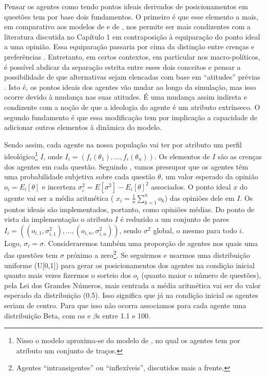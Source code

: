 Pensar os agentes como tendo pontos ideais derivados de posicionamentos em
questões tem por base dois fundamentos. O primeiro é que esse elemento a mais,
em comparativo aos modelos de  e de
, nos permite ser mais condizentes com a
literatura discutida no Capítulo 1 em contraposição à equiparação do ponto ideal
a uma opinião. Essa equiparação passaria por cima da distinção entre crenças e
preferências \cite{list2009judgment}. Entretanto, em certos contextos, em
particular nos macro-políticos, é possível abdicar da separação estrita entre
esses dois conceitos e pensar a possibilidade de que alternativas sejam
elencadas com base em ``atitudes'' prévias
\cite{binmore2008rational,laver2014measuring}. Isto é, os pontos ideais dos
agentes vão mudar ao longo da simulação, mas isso ocorre devido à mudança nas
suas atitudes. É uma mudança assim indireta e condizente com a noção de que a
ideologia do agente é um atributo extrínseco. O segundo fundamento é que essa
modificação tem por implicação a capacidade de adicionar outros elementos à
dinâmica do modelo.

Sendo assim, cada agente na nossa população vai ter por atributo um perfil
ideológico\footnote{Nisso o modelo aproxima-se do modelo de
  , no qual os agentes tem por atributo um
  conjunto de traços.} \(I\), onde \(I_i = (f_i(\theta_1), \ldots, f_i(\theta_n)) \). Os
elementos de \(I\) são as crenças dos agentes em cada questão. Seguindo
, vamos pressupor que os agentes têm uma
probabilidade subjetiva sobre cada questão \(\theta\), um valor esperado da opinião
\( o_i = E_i[\theta]\) e incerteza \( \sigma_i^2 = E[\sigma^2] - E_ i[\theta]^2\) associados. O
ponto ideal \(x\) do agente vai ser a média aritmética ( \(x_i =
\frac{1}{n}\sum_{k=1}^{n} o_k\)) das opiniões dele em \(I\). Os pontos ideais são
implementados, portanto, como opiniões médias. Do ponto de vista da
implementação o atributo \(I\) é reduzido a um conjunto de pares \(I_i =
((o_{i,1},\sigma_{i,1}^2), \ldots, (o_{i,n}, \sigma_{i,n}^2) )\), sendo \(\sigma^2\) global, o mesmo
para todo \(i\). Logo, \(\sigma_i = \sigma\). Consideraremos também uma proporção de
agentes nos quais uma das questões tem \(\sigma\) próximo a zero\footnote{Agentes
  ``intransigentes'' ou ``inflexíveis'', discutidos mais a frente.}. Se
seguirmos  e usarmos uma distribuição uniforme
(U[0,1]) para gerar os posicionamentos dos agentes na condição inicial quanto
mais vezes fizermos o sorteio dos \(o_i\) (quanto maior o número de questões),
pela Lei dos Grandes Números, mais centrada a média aritmética vai ser do valor
esperado da distribuição (0.5). Isso significa que já na condição inicial os
agentes seriam de centro. Para que isso não ocorra associamos para cada agente
uma distribuição Beta, com \(\alpha\)s e \(\beta\)s entre 1.1 e 100.

